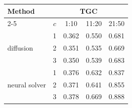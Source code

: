 \begin{subappendices}
\begin{table}[!h]
    \begin{tabular}{lcccc}
        \toprule
        \multirow[c]{2}{*}{Method} & \multicolumn{4}{c}{TGC} \\
        \cmidrule(lr){2-5}
         & $c$ & 1:10 & 11:20 & 21:50 \\
        \midrule
        \multirow[c]{3}{*}{diffusion}
        & 1 & 0.362 & 0.550 & 0.681 \\
        & 2 & 0.351 & 0.535 & 0.669 \\
        & 3 & 0.350 & 0.539 & 0.683 \\
        \midrule
        \multirow[c]{3}{*}{neural solver}
        & 1 & 0.376 & 0.632 & 0.837 \\
        & 2 & 0.371 & 0.641 & 0.855 \\
        & 3 & 0.378 & 0.669 & 0.888 \\
        \bottomrule
    \end{tabular}
    \label{tab:vrmse-vs-context}
\end{table}


\end{subappendices}
